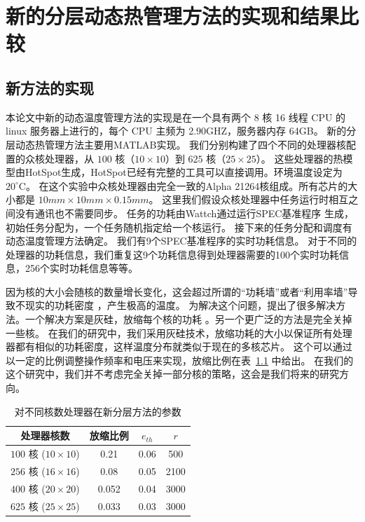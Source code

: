 
\chapter{新的分层动态热管理方法的实现和结果比较}\label{sec:exp}

\section{新方法的实现}\label{sec:method_implement}
本论文中新的动态温度管理方法的实现是在一个具有两个 8 核 16 线程 CPU 的 linux 服务器上进行的，每个 CPU 主频为 2.90GHZ，服务器内存 64GB。
新的分层动态热管理方法主要用MATLAB实现。
我们分别构建了四个不同的处理器核配置的众核处理器，从 $100$ 核（$10 \times 10$）到 $625$ 核（$25 \times 25$）。
这些处理器的热模型由HotSpot生成，HotSpot已经有完整的工具可以直接调用。环境温度设定为 $20^{\circ}$C。
在这个实验中众核处理器由完全一致的Alpha 21264核组成。所有芯片的大小都是 $10mm \times 10mm \times 0.15mm$。
这里我们假设众核处理器中任务运行时相互之间没有通讯也不需要同步。
任务的功耗由Wattch通过运行SPEC基准程序  \cite{Henning:IEEEC'00} 生成，初始任务分配为，一个任务随机指定给一个核运行。
接下来的任务分配和调度有动态温度管理方法确定。
我们有9个SPEC基准程序的实时功耗信息。
对于不同的处理器的功耗信息，我们重复这9个功耗信息得到处理器需要的100个实时功耗信息，256个实时功耗信息等等。

因为核的大小会随核的数量增长变化，这会超过所谓的“功耗墙”或者“利用率墙”导致不现实的功耗密度  \cite{Taylor:MICRO'13} ，产生极高的温度。
为解决这个问题，提出了很多解决方法。一个解决方案是灰硅，放缩每个核的功耗  \cite{Huang:MICRO'11,Taylor:MICRO'13}。另一个更广泛的方法是完全关掉一些核\cite{Taylor:MICRO'13,Shafique:DAC'14}。
在我们的研究中，我们采用灰硅技术，放缩功耗的大小以保证所有处理器都有相似的功耗密度，这样温度分布就类似于现在的多核芯片。
这个可以通过以一定的比例调整操作频率和电压来实现，放缩比例在表~\ref{tab:param} 中给出。
在我们的这个研究中，我们并不考虑完全关掉一部分核的策略，这会是我们将来的研究方向。
\begin{table}[H]
\centering
\caption{对不同核数处理器在新分层方法的参数}\label{tab:param}{
 \begin{tabular}{|c|c|c|c|}
 \hline
 \hline
 处理器核数 &  放缩比例 & $e_{th}$ & $r$ \\
 \hline 
 \hline
 $100$ 核 ($10 \times 10$) & 0.21 & 0.06 & 500  \\
 \hline
 $256$ 核 ($16 \times 16$) & 0.08 & 0.05 & 2100 \\
 \hline
 $400$ 核 ($20 \times 20$) & 0.052 & 0.04 & 3000 \\
 \hline
 $625$ 核 ($25 \times 25$) & 0.033 & 0.03 & 3000 \\
 \hline
 \hline
 \end{tabular}
 }
 \end{table}
 
